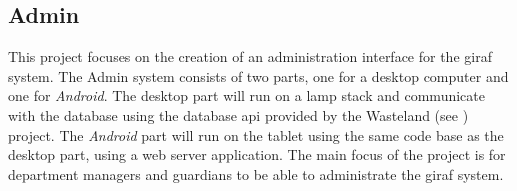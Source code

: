 \subsection{Admin}
\label{sec:admin}
This project focuses on the creation of an administration interface for the \ac{giraf} system. The Admin system consists of two parts, one for a desktop computer and one for \emph{Android}. The desktop part will run on a \ac{lamp} stack and communicate with the database using the database \ac{api} provided by the Wasteland (see ) project. The \emph{Android} part will run on the tablet using the same code base as the desktop part, using a web server application. The main focus of the project is for department managers and guardians to be able to administrate the \ac{giraf} system.
